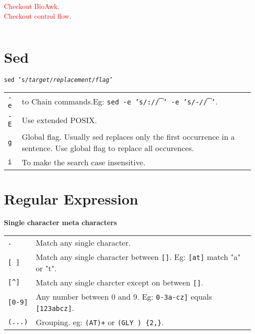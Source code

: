 \begin{tabularx}{\linewidth}{lX}
\hline
\end{tabularx}

\textcolor{red}{Checkout BioAwk}.\\
\textcolor{red}{Checkout control flow}.\\
\begin{tabularx}{\linewidth}{lX}
\hline
\end{tabularx}

\section{Sed}

\texttt{sed 's/\textit{target}/\textit{replacement}/\textit{flag}'}

\begin{tabularx}{\linewidth}{lX}
\texttt{-e} & to Chain commands.Eg: \texttt{sed -e 's/:/\t/' -e 's/-/\t/'}.\\
\texttt{-E} & Use extended POSIX.\\
\texttt{g} & Global flag. Usually sed replaces only the first occurrence  in a sentence. Use global flag to replace all occurences.\\
\texttt{i} & To make the search case insensitive.\\
\end{tabularx}



\section{Regular Expression}

\textbf{Single character meta characters}
\begin{tabularx}{\linewidth}{lX}

\texttt{.} & Match any single character.\\
\texttt{[ ]} & Match any single character between \texttt{[]}. Eg: \texttt{[at]} match "a" or "t".\\
\texttt{[\^{}]} & Match any single charcter except on between \texttt{[]}.\\
\texttt{[0-9]} & Any number between 0 and 9. Eg: \texttt{0-3a-cz]} equals \texttt{[123abcz]}.\\
\texttt{(...)} & Grouping. eg: \texttt{(AT)+} or \texttt{(GLY ) \{2,\}}.\\
\hline

\end{tabularx}


